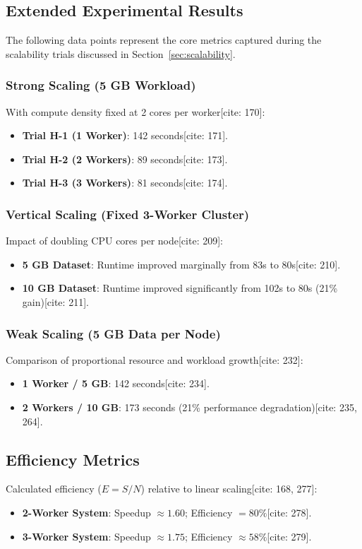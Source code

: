 \subsection{Extended Experimental Results}
The following data points represent the core metrics captured during the scalability trials discussed in Section~\ref{sec:scalability}.

\subsubsection{Strong Scaling (5 GB Workload)}
With compute density fixed at 2 cores per worker[cite: 170]:
\begin{itemize}
    \item \textbf{Trial H-1 (1 Worker)}: 142 seconds[cite: 171].
    \item \textbf{Trial H-2 (2 Workers)}: 89 seconds[cite: 173].
    \item \textbf{Trial H-3 (3 Workers)}: 81 seconds[cite: 174].
\end{itemize}

\subsubsection{Vertical Scaling (Fixed 3-Worker Cluster)}
Impact of doubling CPU cores per node[cite: 209]:
\begin{itemize}
    \item \textbf{5 GB Dataset}: Runtime improved marginally from 83s to 80s[cite: 210].
    \item \textbf{10 GB Dataset}: Runtime improved significantly from 102s to 80s (21\% gain)[cite: 211].
\end{itemize}

\subsubsection{Weak Scaling (5 GB Data per Node)}
Comparison of proportional resource and workload growth[cite: 232]:
\begin{itemize}
    \item \textbf{1 Worker / 5 GB}: 142 seconds[cite: 234].
    \item \textbf{2 Workers / 10 GB}: 173 seconds (21\% performance degradation)[cite: 235, 264].
\end{itemize}

\subsection{Efficiency Metrics}
Calculated efficiency ($E = S/N$) relative to linear scaling[cite: 168, 277]:
\begin{itemize}
    \item \textbf{2-Worker System}: Speedup $\approx 1.60$; Efficiency $= 80\%$[cite: 278].
    \item \textbf{3-Worker System}: Speedup $\approx 1.75$; Efficiency $\approx 58\%$[cite: 279].
\end{itemize}